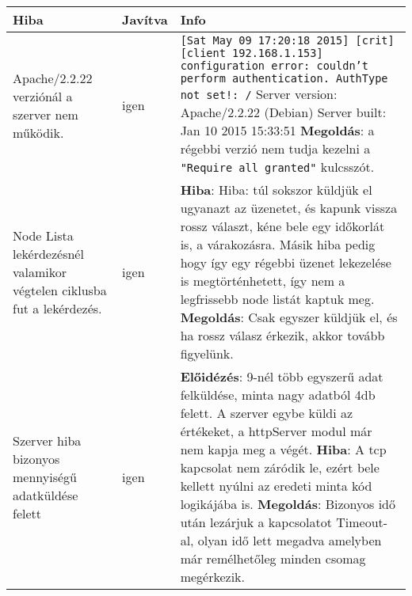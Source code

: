   \begin{center}\begin{tabular}{| p{4cm} | p{1.5cm} | p{8cm} |}
  \hline Hiba & Javítva & Info
    \\ \hline
      	Apache/2.2.22 verziónál a szerver nem működik. 
      &
      	igen
      &
		\texttt{[Sat May 09 17:20:18 2015] [crit] [client 192.168.1.153] configuration error:  couldn't perform authentication. AuthType not set!: /}\newline
		Server version: Apache/2.2.22 (Debian)
		Server built:   Jan 10 2015 15:33:51 
		\newline\textbf{Megoldás}:
		a régebbi verzió nem tudja kezelni a \texttt{"Require all granted"} kulcsszót.
	\\ \hline
        Node Lista lekérdezésnél valamikor végtelen ciklusba fut a lekérdezés. 
      &
      	igen
      &
      	\textbf{Hiba}:
		Hiba: túl sokszor küldjük el ugyanazt az üzenetet, és kapunk vissza rossz választ, kéne bele egy időkorlát is, a várakozásra. Másik hiba pedig hogy így egy régebbi üzenet lekezelése is megtörténhetett, így nem a legfrissebb node listát kaptuk meg. 
		\newline 
		\textbf{Megoldás}: Csak egyszer küldjük el, és ha rossz válasz érkezik, akkor tovább figyelünk.
  	\\ \hline
    	Szerver hiba bizonyos mennyiségű adatküldése felett 
      &
    	igen
      &  
    	\textbf{Előidézés}: 9-nél több egyszerű adat felküldése, minta nagy adatból 4db felett.
    	A szerver egybe küldi az értékeket, a httpServer modul már nem kapja meg a végét. \newline
    	\textbf{Hiba}: A tcp kapcsolat nem záródik le, ezért bele kellett nyúlni az eredeti minta kód logikájába is.\newline
    	\textbf{Megoldás}: Bizonyos idő után lezárjuk a kapcsolatot Timeout-al, olyan idő lett megadva amelyben már remélhetőleg minden csomag megérkezik.
    \\ \hline
	\end{tabular}\end{center}

